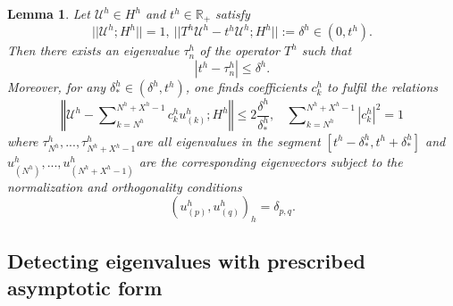 \documentclass[11pt]{article}%
\newtheorem{lemma}[theorem]{Lemma}
\numberwithin{equation}{section}
\begin{document}
\begin{lemma}
\label{lemVL}Let $\mathcal{U}^{h}\in H^{h}$ and $t^{h}\in\mathbb{R}_{+}$
satisfy%
\begin{equation}
||\mathcal{U}^{h};H^{h}||=1,\ ||T^{h}\mathcal{U}^{h}-t^{h}\mathcal{U}%
^{h};H^{h}||:=\delta^{h}\in(0,t^{h}). \label{E6}%
\end{equation}
Then there exists an eigenvalue $\tau_{n}^{h}$ of the operator $T^{h}$ such
that%
\begin{equation}
|t^{h}-\tau_{n}^{h}|\leq\delta^{h}. \label{E7}%
\end{equation}
Moreover, for any $\delta_{\ast}^{h}\in(\delta^{h},t^{h})$, one finds
coefficients $c_{k}^{h}$ to fulfil the relations%
\begin{equation}
\left\Vert \mathcal{U}^{h}-\sum\nolimits_{k=N^{h}}^{N^{h}+X^{h}-1}c_{k}%
^{h}u_{(k)}^{h};H^{h}\right\Vert \leq2\frac{\delta^{h}}{\delta_{\ast}^{h}%
},\ \ \ \ \sum\nolimits_{k=N^{h}}^{N^{h}+X^{h}-1}|c_{k}^{h}|^{2}=1 \label{E8}%
\end{equation}
where $\tau_{N^{h}}^{h},...,\tau_{N^{h}+X^{h}-1}^{h}$are all eigenvalues in
the segment $[t^{h}-\delta_{\ast}^{h},t^{h}+\delta_{\ast}^{h}]$ and
$u_{(N^{h})}^{h},...,u_{(N^{h}+X^{h}-1)}^{h}$ are the corresponding
eigenvectors subject to the normalization and orthogonality conditions%
\begin{equation}
(u_{(p)}^{h},u_{(q)}^{h})_{h}=\delta_{p,q}. \label{E9}%
\end{equation}

\end{lemma}

\subsection{Detecting eigenvalues with prescribed asymptotic
form\label{sect4.4}}
\end{document}
